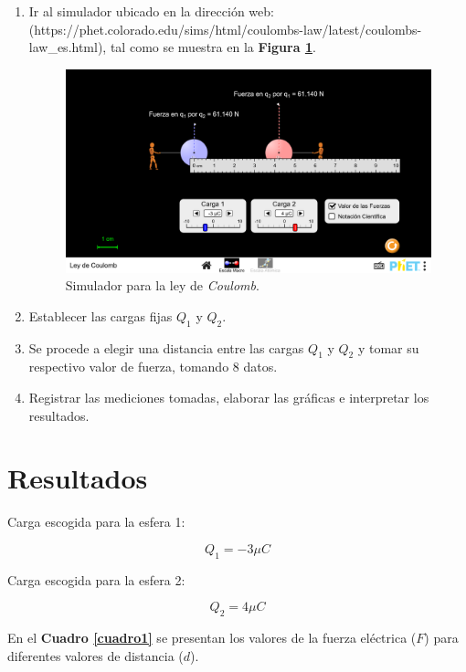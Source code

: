 \documentclass[letter,11pt]{article}
\begin{document}
\begin{enumerate}
\item Ir al simulador ubicado en la dirección web:
(https://phet.colorado.edu/sims/html/coulombs-law/latest/coulombs-law\_es.html),
tal como se muestra en la \textbf{Figura \ref{figura2}}.
\begin{figure}[!h]
\centering
\includegraphics[scale=0.30]{resources/figura2.eps}
\caption{Simulador para la ley de \emph{Coulomb}.}
\label{figura2}
\end{figure}
\item Establecer las cargas fijas $Q_1$ y $Q_2$.
\item Se procede a elegir una distancia entre las cargas $Q_1$ y $Q_2$ y tomar
su respectivo valor de fuerza, tomando 8 datos.
\item Registrar las mediciones tomadas, elaborar las gráficas e interpretar los
resultados.
\end{enumerate}

\section{Resultados}

Carga escogida para la esfera 1:

\begin{equation*}
    Q_1 = -3 \mu C
\end{equation*}

Carga escogida para la esfera 2:

\begin{equation*}
    Q_2 = 4 \mu C
\end{equation*}

En el \textbf{Cuadro \ref{cuadro1}} se presentan los valores de la fuerza
eléctrica ($F$) para diferentes valores de distancia ($d$).
\end{document}
